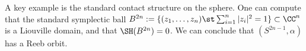 
A key example is the standard contact structure on the sphere. One can compute that the standard symplectic ball $B^{2n}:=\{(z_1, \ldots, z_n)\st \sum_{i=1}^n |z_i|^2=1 \}\subset \CC^n$ is a Liouville domain, and that $\SH(B^{2n})=0$. We can conclude that $(S^{2n-1}, \alpha)$ has a Reeb orbit.